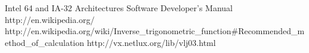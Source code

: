 \begin{thebibliography}{9}
 Intel 64 and IA-32 Architectures Software Developer's Manual 
 http://en.wikipedia.org/
 http://en.wikipedia.org/wiki/Inverse\_trigonometric\_function\#Recommended\_method\_of\_calculation
 http://vx.netlux.org/lib/vlj03.html
\end{thebibliography}


